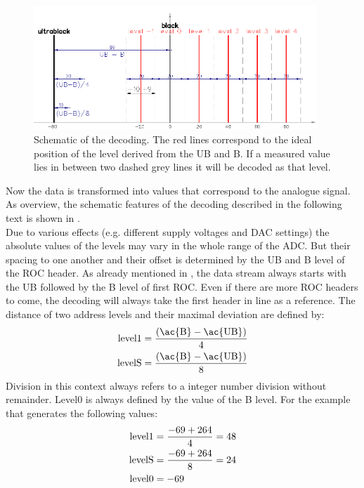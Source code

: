 \documentclass[british,11pt,a4paper]{memoir}
\begin{document}
\begin{figure}[ht]
	\vspace*{-10pt}
	\centering
	\includegraphics[width=0.95\textwidth]{decode}
	\caption{Schematic of the decoding. The red lines correspond to the ideal position of the level derived from the \ac{UB} and \ac{B}. If a measured value lies in between two dashed grey lines it will be decoded as that level.}
	\label{p15}
\end{figure}
Now the data is transformed into values that correspond to the analogue signal. As overview, the schematic features of the decoding described in the following text is shown in .\\
Due to various effects (e.g. different supply voltages and \ac{DAC} settings) the absolute values of the levels may vary in the whole range of the \ac{ADC}. But their spacing to one another and their offset is determined by the \ac{UB} and \ac{B} level of the \ac{ROC} header. As already mentioned in , the data stream always starts with the \ac{UB} followed by the \ac{B} level of first \ac{ROC}. Even if there are more \ac{ROC} headers to come, the decoding will always take the first header in line as a reference. The distance of two address levels and their maximal deviation are defined by:
\begin{align}
	\z{level}1 &= \frac{\left( \z{\ac{B}} - \z{\ac{UB}} \right)}{4}\\
	\z{levelS} &= \frac{\left( \z{\ac{B}} - \z{\ac{UB}} \right)}{8}
\end{align}
Division in this context always refers to a integer number division without remainder. Level$0$ is always defined by the value of the \ac{B} level. For the example that generates the following values:
\begin{align*}
	\text{level}1 &= \frac{-69+264}{4} = 48\\
	\text{levelS} &= \frac{-69+264}{8} = 24\\
	\text{level}0 &= -69
\end{align*}
\end{document}

